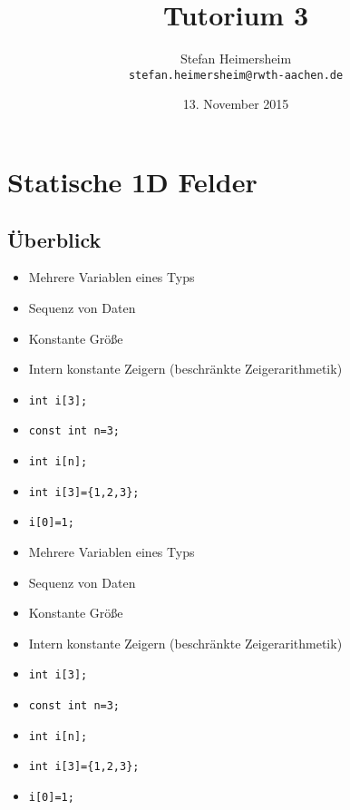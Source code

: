 \documentclass[16pt]{beamer}
\title{Tutorium 3}
\author{Stefan Heimersheim
	\\\texttt{stefan.heimersheim@rwth-aachen.de}}
\date{13. November 2015}
\begin{document}
\begin{frame}
\titlepage
\end{frame}



\section{Statische 1D Felder}
\subsection{Überblick}
\begin{frame}
  \begin{itemize}
    \item Mehrere Variablen eines Typs
    \item Sequenz von Daten
    \item Konstante Größe
    \item Intern konstante Zeigern (beschränkte Zeigerarithmetik)
  \end{itemize}
  \begin{itemize}
    \item \texttt{int i[3];}
    \item \texttt{const int n=3;}
    \item \texttt{int i[n];}
    \item \texttt{int i[3]=\{1,2,3\};}
    \item \texttt{i[0]=1;}
  \end{itemize}
\end{frame}
\begin{frame}
  \begin{itemize}
    \item Mehrere Variablen eines Typs
    \item Sequenz von Daten
    \item Konstante Größe
    \item Intern konstante Zeigern (beschränkte Zeigerarithmetik)
  \end{itemize}
  \begin{itemize}
    \item \texttt{int i[3];}
    \item \texttt{const int n=3;}
    \item \texttt{int i[n];}
    \item \texttt{int i[3]=\{1,2,3\};}
    \item \texttt{i[0]=1;}
  \end{itemize}
\end{frame}
\end{document}

